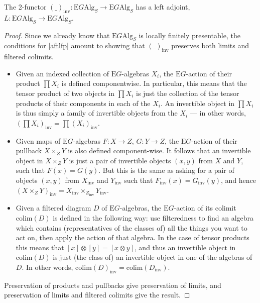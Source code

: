 \begin{prop} \label{invadj} The 2-functor $(\_)_{\mathrm{inv}}: \mathrm{E}G\mathrm{Alg}_S \to \mathrm{E}G\mathrm{Alg}_S$ has a left adjoint, $L: \mathrm{E}G\mathrm{Alg}_S \to \mathrm{E}G\mathrm{Alg}_S$.
\end{prop}
\begin{proof} Since we already know that $\mathrm{E}G\mathrm{Alg}_S$ is locally finitely presentable, the conditions for \cref{aftlfp} amount to showing that $(\_)_{\mathrm{inv}}$ preserves both limits and filtered colimits.
\begin{itemize}
\item Given an indexed collection of $\mathrm{E}G$-algebras $X_i$, the $\mathrm{E}G$-action of their product $\prod X_i$ is defined componentwise. In particular, this means that the tensor product of two objects in $\prod X_i$ is just the collection of the tensor products of their components in each of the $X_i$. An invertible object in $\prod X_i$ is thus simply a family of invertible objects from the $X_i$ --- in other words, $(\prod X_i)_{\mathrm{inv}} = \prod (X_i)_{\mathrm{inv}}$.
\item Given maps of $\mathrm{E}G$-algebras $F: X \to Z$, $G : Y \to Z$, the $\mathrm{E}G$-action of their pullback $X \times_Z Y$ is also defined component-wise. It follows that an invertible object in $X \times_Z Y$ is just a pair of invertible objects $(x, y)$ from $X$ and $Y$, such that $F(x) = G(y)$. But this is the same as asking for a pair of objects $(x, y)$ from $X_{\mathrm{inv}}$ and $Y_{\mathrm{inv}}$ such that $F_{\mathrm{inv}}(x) = G_{\mathrm{inv}}(y)$, and hence $(X \times_Z Y)_{\mathrm{inv}} = X_{\mathrm{inv}} \times_{Z_{\mathrm{inv}}} Y_{\mathrm{inv}}$.
\item Given a filtered diagram $D$ of $\mathrm{E}G$-algebras, the $\mathrm{E}G$-action of its colimit $\mathrm{colim}(D)$ is defined in the following way: use filteredness to find an algebra which contains (representatives of the classes of) all the things you want to act on, then apply the action of that algebra. In the case of tensor products this means that $[x]\otimes[y] = [x \otimes y]$, and thus an invertible object in $\mathrm{colim}(D)$ is just (the class of) an invertible object in one of the algebras of $D$. In other words, $\mathrm{colim}(D)_{\mathrm{inv}} = \mathrm{colim}(D_{\mathrm{inv}})$.
\end{itemize}
Preservation of products and pullbacks give preservation of limits, and preservation of limits and filtered colimits give the result.
\end{proof}

